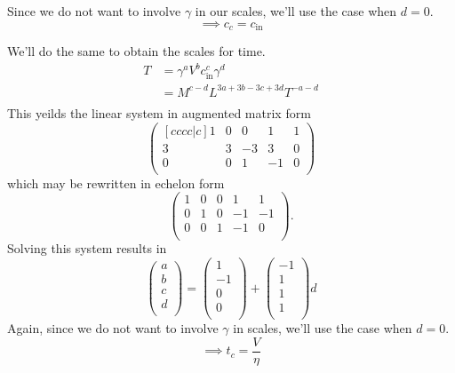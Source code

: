 \documentclass[12pt]{article}
\begin{document}
Since we do not want to involve $\gamma$ in our scales, we'll use the case when
$d=0$.
\begin{equation}
  \implies c_c = c_{\text{in}}
\end{equation}

We'll do the same to obtain the scales for time.
\begin{equation}
  \begin{aligned}
    T &= \gamma^aV^bc_{\text{in}}^c\gamma^d \\
    &= M^{c-d}L^{3a+3b-3c+3d}T^{-a-d} \\
  \end{aligned}
\end{equation}
This yeilds the linear system in augmented matrix form
\begin{equation}
  \begin{pmatrix}[cccc|c]
    1 & 0 & 0 & 1 & 1 \\
    3 & 3 & -3 & 3 & 0 \\
    0 & 0 & 1 & -1 & 0 \\
  \end{pmatrix}
\end{equation}
which may be rewritten in echelon form
\begin{equation}
  \begin{pmatrix}
    1 & 0 & 0 & 1 & 1 \\
    0 & 1 & 0 & -1 & -1 \\
    0 & 0 & 1 & -1 & 0 \\
  \end{pmatrix}.
\end{equation}
Solving this system results in
\begin{equation}
  \begin{pmatrix}
    a \\ b \\ c \\ d \\
  \end{pmatrix} =
  \begin{pmatrix}
    1 \\ -1 \\ 0 \\ 0 \\
  \end{pmatrix} +
  \begin{pmatrix}
    -1 \\ 1 \\ 1 \\ 1 \\
  \end{pmatrix}d
\end{equation}
Again, since we do not want to involve $\gamma$ in scales, we'll use the case
when $d=0$.
\begin{equation}
  \implies t_c = \frac{V}{\eta}
\end{equation}
\end{document}

